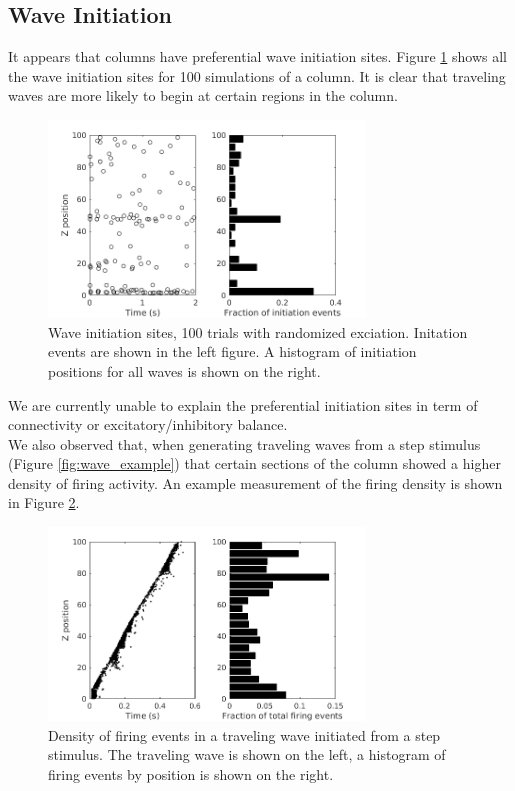 \documentclass[a4paper,11pt]{article}
\begin{document}
\subsection{Wave Initiation}
It appears that columns have preferential wave initiation sites.
Figure \ref{fig:wave_initiation} shows all the wave initiation sites for 100 simulations of a column.
It is clear that traveling waves are more likely to begin at certain regions in the column.
\begin{figure}[!htb]
 \caption{Wave initiation sites, 100 trials with randomized exciation. Initation events are shown in the left figure. A histogram of initiation positions for all waves is shown on the right.}
 \label{fig:wave_initiation}
 \centering
   \includegraphics[width=0.75\textwidth]{fig/InitiationSites_100sims}
\end{figure}
We are currently unable to explain the preferential initiation sites in term of connectivity or excitatory/inhibitory balance. 
\\
We also observed that, when generating traveling waves from a step stimulus (Figure \ref{fig:wave_example}) that certain sections of the column showed a higher density of firing activity.
An example measurement of the firing density is shown in Figure \ref{fig:wave_density}.
\begin{figure}[!htb]
 \caption{Density of firing events in a traveling wave initiated from a step stimulus. The traveling wave is shown on the left, a histogram of firing events by position is shown on the right.}
 \label{fig:wave_density}
 \centering
   \includegraphics[width=0.75\textwidth]{fig/ImpulseWaveDensity}
\end{figure}
\end{document}

